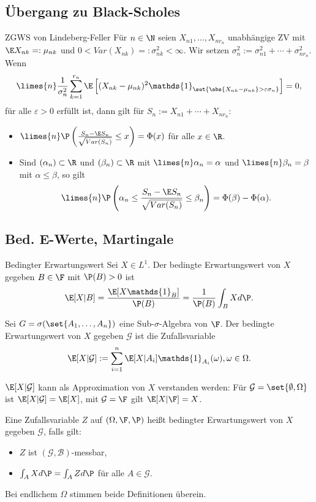 \subsection{Übergang zu Black-Scholes}

\begin{karte}{ZGWS von Lindeberg-Feller}
Für \(n\in \N\) seien \(X_{n1}, \ldots, X_{nr_n}\) unabhängige ZV mit 
\(\E X_{nk} =: \mu_{nk}\) und \(0 < Var(X_{nk}) =: \sigma_{nk}^2 < \infty\). 
Wir setzen \(\sigma_n^2 := \sigma_{n1}^2 + \cdots + \sigma_{n r_n}^2\). 
Wenn 
\[ \limes{n} \frac{1}{\sigma_n^2} \sum_{k=1}^{r_n} \E \left[ (X_{nk} - \mu_{nk})^2 \mathds{1}_{\set{ \abs{X_{nk} - \mu_{nk}} > \varepsilon \sigma_n }} \right] = 0,  \]
für alle \(\varepsilon > 0\) erfüllt ist, dann gilt für \(S_n := X_{n1} + \cdots + X_{n r_n}\): 
\begin{itemize}
    \item \(\limes{n} \P\left( \frac{S_n - \E S_n}{\sqrt{Var(S_n)}} \leq x \right) = \Phi(x) \) für alle \(x \in \R\).
    \item Sind \((\alpha_n) \subset \R\) und \((\beta_n) \subset \R\) mit \(\limes{n} \alpha_n = \alpha\) und \(\limes{n} \beta_n = \beta\)
    mit \(\alpha \leq \beta\), so gilt 
    \[ \limes{n} \P \left( \alpha_n \leq \frac{S_n - \E S_n}{\sqrt{Var(S_n)}} \leq \beta_n \right) = \Phi(\beta) - \Phi(\alpha). \]
\end{itemize}
\end{karte}

\subsection*{Bed. E-Werte, Martingale}

\begin{karte}{Bedingter Erwartungswert}
Sei \(X \in L^1\). Der bedingte Erwartungswert von \(X\) gegeben \(B\in \F\) 
mit \(\P(B) > 0\) ist 
\[ \E [X | B] = \frac{\E[X \mathds{1}_B]}{\P(B)} = \frac{1}{\P(B)} \int_B X d\P. \]

Sei \(G = \sigma(\set{A_1, \ldots, A_n})\) eine Sub-\(\sigma\)-Algebra von \(\F\). 
Der bedingte Erwartungswert von \(X\) gegeben \(\mathcal{G}\) ist die Zufallsvariable 
\[ \E[X|\mathcal{G}] := \sum_{i=1}^n \E [X | A_i] \mathds{1}_{A_i}(\omega), \omega \in \Omega. \]

\(\E [X|\mathcal{G}]\) kann als Approximation von \(X\) verstanden werden: 
Für \(\mathcal{G} = \set{\emptyset, \Omega}\) ist \(\E[X|\mathcal{G}] = \E[X]\), 
mit \( \mathcal{G} = \F \) gilt \(\E[X|\F] = X\).

Eine Zufallsvariable \(Z\) auf \((\Omega, \F, \P)\) heißt bedingter 
Erwartungswert von \(X\) gegeben \(\mathcal{G}\), falls gilt: 
\begin{itemize}
    \item \(Z\) ist \((\mathcal{G}, \mathcal{B})\)-messbar,
    \item \(\int_A X d\P = \int_A Z d\P \) für alle \(A\in \mathcal{G}\).
\end{itemize}
Bei endlichem \(\Omega\) stimmen beide Definitionen überein.
\end{karte}

